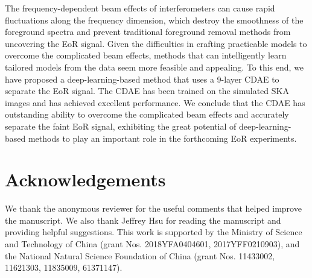 \documentclass[fleqn,usenatbib]{mnras}
\begin{document}
The frequency-dependent beam effects of interferometers can cause
rapid fluctuations along the frequency dimension,
which destroy the smoothness of the foreground spectra and prevent
traditional foreground removal methods from uncovering the EoR signal.
Given the difficulties in crafting practicable models to overcome the
complicated beam effects, methods that can intelligently learn tailored
models from the data seem more feasible and appealing.
To this end, we have proposed a deep-learning-based method that uses
a 9-layer CDAE to separate the EoR signal.
The CDAE has been trained on the simulated SKA images and has achieved
excellent performance.
We conclude that the CDAE has outstanding ability to overcome the
complicated beam effects and accurately separate the faint EoR signal,
exhibiting the great potential of deep-learning-based methods
to play an important role in the forthcoming EoR experiments.


\section*{Acknowledgements}

We thank the anonymous reviewer for the useful comments that helped
improve the manuscript.
We also thank Jeffrey Hsu for reading the manuscript and providing
helpful suggestions.
This work is supported by
the Ministry of Science and Technology of China
(grant Nos. 2018YFA0404601, 2017YFF0210903),
and the National Natural Science Foundation of China
(grant Nos. 11433002, 11621303, 11835009, 61371147).










\bsp	%
\label{lastpage}
\end{document}

